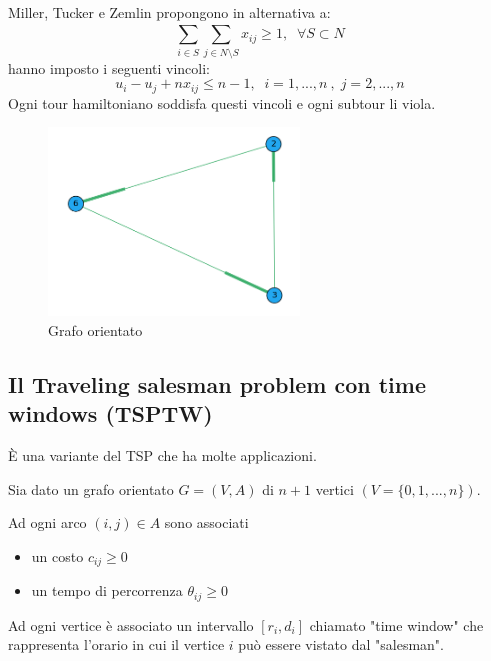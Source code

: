Miller, Tucker e Zemlin propongono in alternativa a:
\begin{equation}\tag{*}
	\displaystyle\sum_{i\in S}^{}\sum_{j\in N\setminus S}^{} x_{ij} \ge 1,\;\;\forall S\subset N
\end{equation}
hanno imposto i seguenti vincoli:
\begin{equation}
	u_{i}-u_{j}+nx_{ij}\le n-1,\;\; i=1,...,n\:,\;j=2,...,n
\end{equation}
Ogni tour hamiltoniano soddisfa questi vincoli e ogni subtour li viola.\newline
\begin{figure}
	\vspace{-2em}
	\includegraphics[height=5cm]{images/graph1.png}
	\caption{Grafo orientato}
\end{figure}
\newpage

\subsection{Il Traveling salesman problem con time windows (TSPTW)}
È una variante del TSP che ha molte applicazioni.

Sia dato un grafo orientato $G=(V,A)$ di $n+1$ vertici $(V=\{0,1,...,n\})$.

Ad ogni arco $(i,j)\in A$ sono associati
\begin{itemize}
	\item un costo $c_{ij} \ge 0$
	\item un tempo di percorrenza $\theta_{ij}\ge 0$
\end{itemize}
Ad ogni vertice è associato un intervallo $[r_{i},d_{i}]$ chiamato "time window" che rappresenta l'orario in cui il vertice $i$ può essere vistato dal "salesman".

